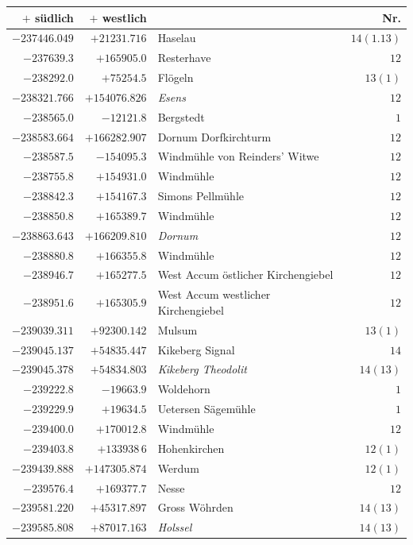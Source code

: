 \clearpage{}%
\begin{center}\begingroup\fontsize{8}{9}\selectfont
\setlength{\tabcolsep}{4pt}
\begin{tabular}{r|r|p{170pt}|r}\hline
\(+\) südlich&\(+\) westlich&&Nr.\\\hline
\(-237446.049\)&\(+21231.716\)&Haselau&\(14(1.13)\)\\
\(-237639.3\)&\(+165905.0\)&Resterhave&\(12\)\\
\(-238292.0\)&\(+75254.5\)&Flögeln&\(13(1)\)\\
\(-238321.766\)&\(+154076.826\)&\textit{Esens}&\(12\)\\
\(-238565.0\)&\(-12121.8\)&Bergstedt&\(1\)\\
\(-238583.664\)&\(+166282.907\)&Dornum Dorfkirchturm&\(12\)\\
\(-238587.5\)&\(-154095.3\)&Windmühle von Reinders’ Witwe&\(12\)\\
\(-238755.8\)&\(+154931.0\)&Windmühle&\(12\)\\
\(-238842.3\)&\(+154167.3\)&Simons Pellmühle&\(12\)\\
\(-238850.8\)&\(+165389.7\)&Windmühle&\(12\)\\
\(-238863.643\)&\(+166209.810\)&\textit{Dornum}&\(12\)\\
\(-238880.8\)&\(+166355.8\)&Windmühle&\(12\)\\
\(-238946.7\)&\(+165277.5\)&West Accum östlicher Kirchengiebel&\(12\)\\
\(-238951.6\)&\(+165305.9\)&West Accum westlicher Kirchengiebel&\(12\)\\
\(-239039.311\)&\(+92300.142\)&Mulsum&\(13(1)\)\\
\(-239045.137\)&\(+54835.447\)&Kikeberg Signal&\(14\)\\
\(-239045.378\)&\(+54834.803\)&\textit{Kikeberg Theodolit}&\(14(13)\)\\
\(-239222.8\)&\(-19663.9\)&Woldehorn&\(1\)\\
\(-239229.9\)&\(+19634.5\)&Uetersen Sägemühle&\(1\)\\
\(-239400.0\)&\(+170012.8\)&Windmühle&\(12\)\\
\(-239403.8\)&\(+133938\,6\)&Hohenkirchen&\(12(1)\)\\
\(-239439.888\)&\(+147305.874\)&Werdum&\(12(1)\)\\
\(-239576.4\)&\(+169377.7\)&Nesse&\(12\)\\
\(-239581.220\)&\(+45317.897\)&Gross Wöhrden&\(14(13)\)\\
\(-239585.808\)&\(+87017.163\)&\textit{Holssel}&\(14(13)\)\\

\end{tabular}
\end{center}
